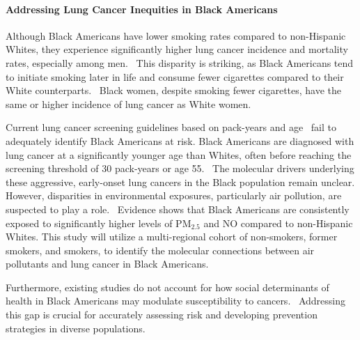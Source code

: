 \paragraph{Addressing Lung Cancer Inequities in Black Americans}
Although Black Americans have lower smoking rates compared to non-Hispanic Whites, 
they experience significantly higher lung cancer incidence and mortality rates, especially among men.~\cite{belony_abstract_2022,thaiparambil_abstract_2023,valencia_interrogating_2022} 
This disparity is striking, as Black Americans tend to initiate smoking later in life and consume fewer cigarettes compared to their White counterparts.~\cite{thaiparambil_abstract_2023,hede_drilling_2010} 
Black women, despite smoking fewer cigarettes, have the same or higher incidence of lung cancer as White women. %

\vspace{1em}
\noindent
Current lung cancer screening guidelines based on pack-years and age~\cite{landy_absolute_2024} fail to adequately identify Black Americans at risk.
Black Americans are diagnosed with lung cancer at a significantly younger age than Whites, often before reaching the screening threshold of 30 pack-years or age 55.~\cite{meza_evaluation_2021} 
The molecular drivers underlying these aggressive, early-onset lung cancers in the Black population remain unclear.
However, disparities in environmental exposures, particularly air pollution, are suspected to play a role.~\cite{marcinkiewicz_impact_2023}
Evidence shows that Black Americans are consistently exposed to significantly higher levels of PM$_{2.5}$ and NO compared to non-Hispanic Whites. %
This study will utilize a multi-regional cohort of non-smokers, former smokers, and smokers,
to identify the molecular connections between air pollutants and lung cancer in Black Americans.

\vspace{1em}
\noindent
Furthermore, existing studies do not account for how social determinants of health in Black Americans may modulate susceptibility to cancers.~\cite{valencia_interrogating_2022} 
Addressing this gap is crucial for accurately assessing risk and developing prevention strategies in diverse populations.

